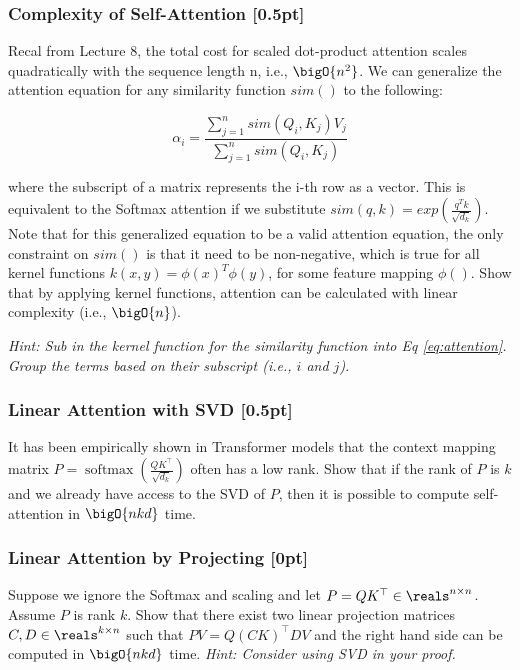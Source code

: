 \subsubsection{Complexity of Self-Attention {\color{blue} [0.5pt]} \LI}


Recal from Lecture 8, the total cost for scaled dot-product attention scales quadratically with the sequence length n, i.e., $\bigO{n^2}$. We can generalize the attention equation for any similarity function $sim()$ to the following: 

\begin{equation}
    \alpha_i = \frac{\sum_{j=1}^{n}{sim(Q_i, K_j)V_j}}{\sum_{j=1}^{n}{sim(Q_i, K_j)}}
    \label{eq:attention}
\end{equation}


where the subscript of a matrix represents the i-th row as a vector. This is equivalent to the Softmax attention if we substitute $sim(q, k) = exp(\frac{q^T k}{\sqrt{d_k}})$. Note that for this generalized equation to be a valid attention equation, the only constraint on $sim()$ is that it need to be non-negative, which is true for all kernel functions $k(x, y) = \phi(x)^T \phi(y)$, for some feature mapping $\phi()$. Show that by applying kernel functions, attention can be calculated with linear complexity (i.e., $\bigO{n}$). 

\textit{Hint: Sub in the kernel function for the similarity function into Eq \ref{eq:attention}. Group the terms based on their subscript (i.e., $i$ and $j$).
} 

\subsubsection{Linear Attention with SVD {\color{blue} [0.5pt]} \LII}

It has been empirically shown in Transformer models that the context mapping matrix $P = \operatorname{softmax}\left(\frac{QK^\top}{\sqrt{d_k}}\right)$ often has a low rank. Show that if the rank of $P$ is $k$ and we already have access to the SVD of $P$, then it is possible to compute self-attention in $\bigO{nkd}$ time.


\subsubsection{Linear Attention by Projecting [0pt]}

Suppose we ignore the Softmax and scaling and let $P = QK^\top \in \reals^{n\times n}$. Assume $P$ is rank $k$. Show that there exist two linear projection matrices $C, D \in \reals^{k\times n}$ such that $PV = Q(CK)^\top DV$ and the right hand side can be computed in $\bigO{nkd}$ time. \textit{Hint: Consider using SVD in your proof.}


